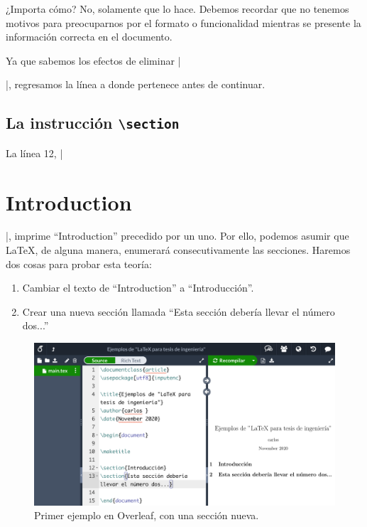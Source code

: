 ¿Importa cómo? No, solamente que lo hace. Debemos recordar que no tenemos motivos para preocuparnos por el formato o funcionalidad mientras se presente la información correcta en el documento.

Ya que sabemos los efectos de eliminar |\maketitle|, regresamos la línea a donde pertenece antes de continuar.



\subsection{La instrucción \texttt{\textbackslash{}section}}
\label{sub:la_instruccion_section}



La línea 12, |\section{Introduction}|, imprime ``Introduction'' precedido por un uno. Por ello, podemos asumir que \LaTeX, de alguna manera, enumerará consecutivamente las secciones. Haremos dos cosas para probar esta teoría:
\begin{enumerate}
	\item Cambiar el texto de ``Introduction'' a ``Introducción''.
	\item Crear una nueva sección llamada ``Esta sección debería llevar el número dos...''
\end{enumerate}

\begin{figure}[ht!]
	\centering
	\includegraphics[width=\linewidth]{img/overleaf_seccion_dos_300ppi.png}
	\caption{Primer ejemplo en Overleaf, con una sección nueva.}
	\label{fig:overleaf_seccion_dos}
\end{figure}


